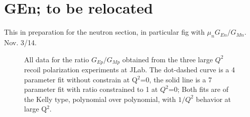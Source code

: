 \section{GEn; to be relocated}

This in preparation  for the neutron section, in particular fig with $\mu_nG_{En}/G_{Mn}$. Nov. 3/14.

\begin{figure}
\begin{center}
\caption{All data for the ratio $G_{Ep}/G_{Mp}$ obtained from the three large $Q^2$ recoil polarization experiments at JLab. The dot-dashed curve is a 4 parameter fit without constrain at Q$^2$=0, the solid line is a 7 parameter fit with ratio constrained to 1 at $Q^2$=0; Both fits are of the Kelly type, polynomial over polynomial, with $1/Q^2$ behavior at large Q$^2$.}  
\label{fig:gepgmp}
\end{center}
\end{figure}


